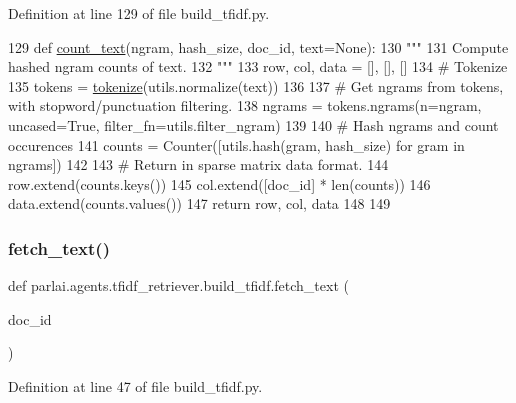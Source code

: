 Definition at line 129 of file build\+\_\+tfidf.\+py.


\begin{DoxyCode}
129 \textcolor{keyword}{def }\hyperlink{namespaceparlai_1_1agents_1_1tfidf__retriever_1_1build__tfidf_a76bae1c966a21d123cb91949d6c8ec20}{count\_text}(ngram, hash\_size, doc\_id, text=None):
130     \textcolor{stringliteral}{"""}
131 \textcolor{stringliteral}{    Compute hashed ngram counts of text.}
132 \textcolor{stringliteral}{    """}
133     row, col, data = [], [], []
134     \textcolor{comment}{# Tokenize}
135     tokens = \hyperlink{namespaceparlai_1_1agents_1_1tfidf__retriever_1_1build__tfidf_a1fdb457e98eb4e4c26047e229686a616}{tokenize}(utils.normalize(text))
136 
137     \textcolor{comment}{# Get ngrams from tokens, with stopword/punctuation filtering.}
138     ngrams = tokens.ngrams(n=ngram, uncased=\textcolor{keyword}{True}, filter\_fn=utils.filter\_ngram)
139 
140     \textcolor{comment}{# Hash ngrams and count occurences}
141     counts = Counter([utils.hash(gram, hash\_size) \textcolor{keywordflow}{for} gram \textcolor{keywordflow}{in} ngrams])
142 
143     \textcolor{comment}{# Return in sparse matrix data format.}
144     row.extend(counts.keys())
145     col.extend([doc\_id] * len(counts))
146     data.extend(counts.values())
147     \textcolor{keywordflow}{return} row, col, data
148 
149 
\end{DoxyCode}
\mbox{\label{namespaceparlai_1_1agents_1_1tfidf__retriever_1_1build__tfidf_a8f16fdf4641c497d12c19f128ed4647a}} 
\subsubsection{\texorpdfstring{fetch\+\_\+text()}{fetch\_text()}}
{\footnotesize\ttfamily def parlai.\+agents.\+tfidf\+\_\+retriever.\+build\+\_\+tfidf.\+fetch\+\_\+text (\begin{DoxyParamCaption}\item[{}]{doc\+\_\+id }\end{DoxyParamCaption})}



Definition at line 47 of file build\+\_\+tfidf.\+py.


